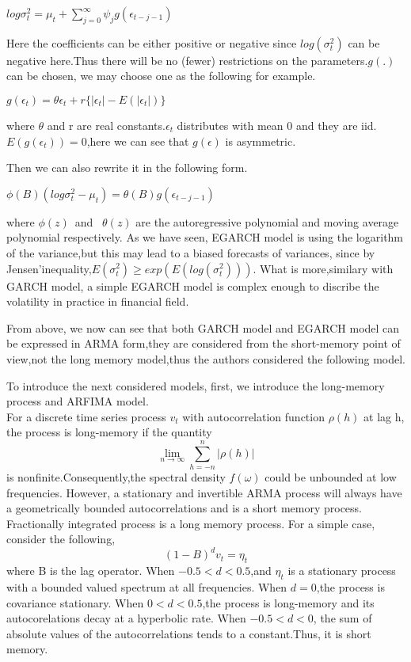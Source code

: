 \documentclass[10pt,a4paper]{article}
\begin{document}
\begin{center}$\displaystyle log\sigma^2_t=\mu_t+\sum_{j=0}^{\infty}\psi_j g(\epsilon_{t-j-1}) $\end{center}

Here the coefficients can be either positive or negative since $log(\sigma^2_t)$ can be negative here.Thus there will be no (fewer) restrictions on the parameters.$g(.)$ can be chosen, we may choose one as the following for example.
 
\begin{center}$\displaystyle g(\epsilon_t)=\theta\epsilon_t+r\{|\epsilon_t|-E(|\epsilon_t|)\}$\end{center} where $\theta$ and r are real constants.$\epsilon_t$ distributes with mean 0 and they are iid.$E(g(\epsilon_t))=0$,here we can see that $g(\epsilon)$ is asymmetric. 

Then we can also rewrite it in the following form.

\begin{center}$\displaystyle \phi(B)(log\sigma^2_t-\mu_t)=\theta(B)g(\epsilon_{t-j-1})$\end{center}

where $\phi(z)$\ and \ $\theta(z)$ are the autoregressive polynomial  and moving average polynomial respectively. As we have seen, EGARCH model is using the logarithm of the variance,but this may lead to a biased forecasts of variances, since by Jensen'inequality,$E(\sigma^2_t)\geq exp(E(log(\sigma^2_t)))$. What is more,similary with GARCH model, a simple EGARCH model is complex enough to discribe the volatility in practice in financial field.





From above, we now can see that both GARCH model and EGARCH model can be expressed in ARMA form,they are considered from the short-memory point of view,not the long memory model,thus the authors considered the following model.


  
  To introduce the next considered models, first, we introduce the long-memory process and ARFIMA model.\\
  
  For a discrete time series process $v_t$ with autocorrelation function $\rho (h)$ at lag h, the process is long-memory if the quantity
$$\lim\limits_{n\rightarrow\infty} \sum_{h=-n}^{n}|\rho(h)|$$
is nonfinite.Consequently,the spectral density $f(\omega)$ could be unbounded at low frequencies. However, a stationary and invertible ARMA process will always have a geometrically bounded autocorrelations and is a short memory process. Fractionally integrated process is a long memory process. For a simple case, consider the following,
$$(1-B)^dv_t=\eta_t$$
where B is the lag operator. When $-0.5<d<0.5$,and $\eta_t$ is a stationary process with a bounded valued spectrum at all frequencies. When $d=0$,the process is covariance stationary. When $0<d<0.5$,the process is long-memory and its autocorelations decay at a hyperbolic rate. When $-0.5<d<0$, the sum of absolute values of the autocorrelations tends to a constant.Thus, it is short memory.\\
\end{document}
